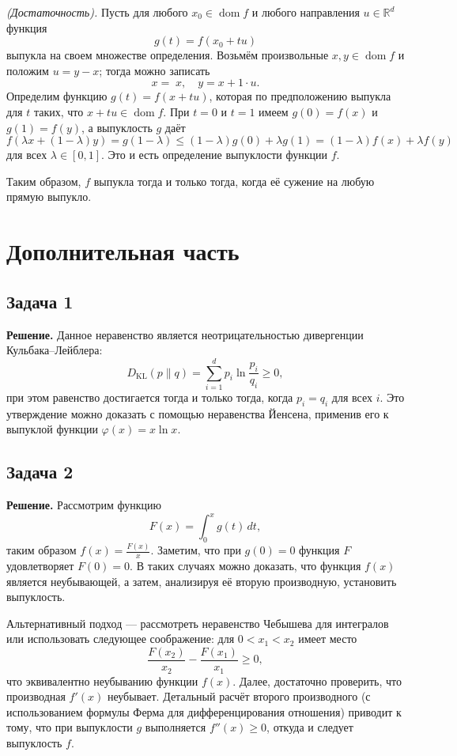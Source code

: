 \documentclass[a4paper,12pt]{article}
\begin{document}
	\emph{(Достаточность).} Пусть для любого $x_0\in\operatorname{dom}f$ и любого направления $u\in\mathbb{R}^d$ функция 
	\[
	g(t)=f(x_0+tu)
	\]
	выпукла на своем множестве определения. Возьмём произвольные $x,y\in\operatorname{dom}f$ и положим $u=y-x$; тогда можно записать
	\[
	x=\;x,\quad y=x+1\cdot u.
	\]
	Определим функцию $g(t)=f(x+tu)$, которая по предположению выпукла для $t$ таких, что $x+tu\in\operatorname{dom}f$. При $t=0$ и $t=1$ имеем $g(0)=f(x)$ и $g(1)=f(y)$, а выпуклость $g$ даёт
	\[
	f(\lambda x+(1-\lambda)y)=g(1-\lambda)\le (1-\lambda)g(0)+\lambda g(1)=(1-\lambda)f(x)+\lambda f(y)
	\]
	для всех $\lambda\in[0,1]$. Это и есть определение выпуклости функции $f$. 
	
	Таким образом, $f$ выпукла тогда и только тогда, когда её сужение на любую прямую выпукло.
	
	\vspace{1em}
	
	\section*{Дополнительная часть}
	
	\subsection*{Задача 1}
	\textbf{Решение.} Данное неравенство является неотрицательностью дивергенции Кульбака–Лейблера:
	\[
	D_{\mathrm{KL}}(p\|q)=\sum_{i=1}^d p_i \ln\frac{p_i}{q_i}\ge 0,
	\]
	при этом равенство достигается тогда и только тогда, когда $p_i=q_i$ для всех $i$. Это утверждение можно доказать с помощью неравенства Йенсена, применив его к выпуклой функции $\varphi(x)=x\ln x$.
	
	\vspace{0.5em}
	
	\subsection*{Задача 2}
	\textbf{Решение.} Рассмотрим функцию 
	\[
	F(x)=\int_0^x g(t)\,dt,
	\]
	таким образом $f(x)=\frac{F(x)}{x}$. Заметим, что при $g(0)=0$ функция $F$ удовлетворяет $F(0)=0$. В таких случаях можно доказать, что функция $f(x)$ является неубывающей, а затем, анализируя её вторую производную, установить выпуклость. 
	
	Альтернативный подход --- рассмотреть неравенство Чебышева для интегралов или использовать следующее соображение: для $0 < x_1 < x_2$ имеет место
	\[
	\frac{F(x_2)}{x_2} - \frac{F(x_1)}{x_1} \ge 0,
	\]
	что эквивалентно неубыванию функции $f(x)$. Далее, достаточно проверить, что производная $f'(x)$ неубывает. Детальный расчёт второго производного (с использованием формулы Ферма для дифференцирования отношения) приводит к тому, что при выпуклости $g$ выполняется $f''(x)\ge 0$, откуда и следует выпуклость $f$.
	
\end{document}
